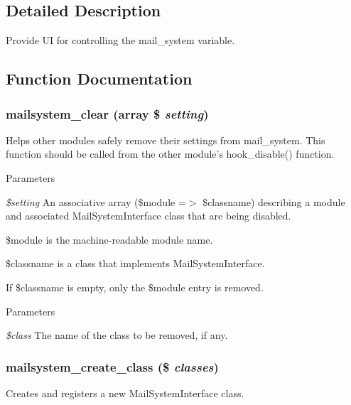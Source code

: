 \subsection{Detailed Description}
Provide UI for controlling the mail\_\-system variable. 

\subsection{Function Documentation}
\hypertarget{mailsystem_8module_ad8ad240cc7b72d29e1dad8cba00f85b0}{
\subsubsection[{mailsystem\_\-clear}]{\setlength{\rightskip}{0pt plus 5cm}mailsystem\_\-clear (array \$ {\em setting})}}
\label{mailsystem_8module_ad8ad240cc7b72d29e1dad8cba00f85b0}
Helps other modules safely remove their settings from mail\_\-system. This function should be called from the other module's hook\_\-disable() function.


\begin{DoxyParams}{Parameters}
\item[{\em \$setting}]An associative array (\$module =$>$ \$classname) describing a module and associated MailSystemInterface class that are being disabled.
\begin{DoxyItemize}
\item \$module is the machine-\/readable module name.
\item \$classname is a class that implements MailSystemInterface.
\end{DoxyItemize}\end{DoxyParams}
If \$classname is empty, only the \$module entry is removed.


\begin{DoxyParams}{Parameters}
\item[{\em \$class}]The name of the class to be removed, if any. \end{DoxyParams}
\hypertarget{mailsystem_8module_ab195299394dfae7d0d164998d261ed36}{
\subsubsection[{mailsystem\_\-create\_\-class}]{\setlength{\rightskip}{0pt plus 5cm}mailsystem\_\-create\_\-class (\$ {\em classes})}}
\label{mailsystem_8module_ab195299394dfae7d0d164998d261ed36}
Creates and registers a new MailSystemInterface class.

